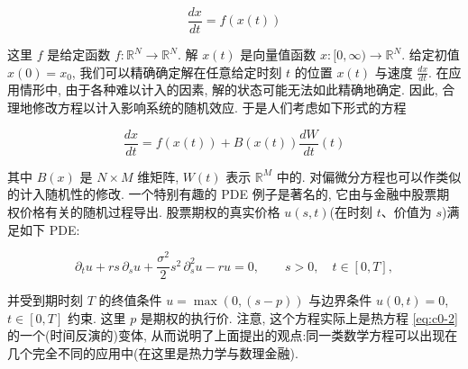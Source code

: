 \begin{equation}\label{eq:c0-26}
\frac{d x}{d t} = f(x(t))
\end{equation}

这里 $f$ 是给定函数 $f : \mathbb{R}^{N} \to \mathbb{R}^{N}$.
解 $x(t)$ 是向量值函数 $x : [0, \infty) \to \mathbb{R}^{N}$.
给定初值 $x(0) = x_{0}$, 我们可以精确确定解在任意给定时刻 $t$ 的位置 $x(t)$ 与速度 $\frac{d x}{d t}$.
在应用情形中, 由于各种难以计入的因素, 解的状态可能无法如此精确地确定.
因此, 合理地修改方程以计入影响系统的随机效应.
于是人们考虑如下形式的方程

\begin{equation}\label{eq:c0-27}
\frac{d x}{d t} = f(x(t)) + B(x(t)) \frac{d W}{d t}(t)
\end{equation}

其中 $B(x)$ 是 $N \times M$ 维矩阵, $W(t)$ 表示 $\mathbb{R}^{M}$ 中的.
对偏微分方程也可以作类似的计入随机性的修改.
一个特别有趣的 PDE 例子是著名的, 它由与金融中股票期权价格有关的随机过程导出.
股票期权的真实价格 $u(s, t)$(在时刻 $t$、价值为 $s$)满足如下 PDE:

\begin{equation}\label{eq:c0-28}
\partial_{t} u + r s \, \partial_{s} u + \frac{\sigma^{2}}{2} s^{2} \, \partial_{s}^{2} u - r u = 0, \qquad s > 0, \quad t \in [0, T],
\end{equation}

并受到期时刻 $T$ 的终值条件 $u = \max(0, (s - p))$ 与边界条件 $u(0, t) = 0$, $t \in [0, T]$ 约束.
这里 $p$ 是期权的执行价.
注意, 这个方程实际上是热方程 \eqref{eq:c0-2} 的一个(时间反演的)变体, 从而说明了上面提出的观点:同一类数学方程可以出现在几个完全不同的应用中(在这里是热力学与数理金融).
